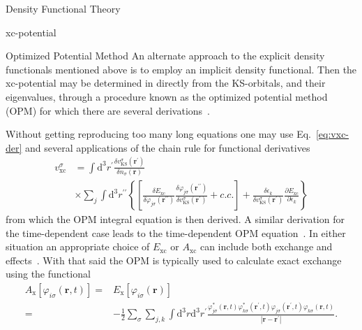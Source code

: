 \documentclass[letterpaper, 11 pt]{report}
\begin{document}
\begin{chapter}{Density Functional Theory \label{chap:dft}}
\begin{section}{xc-potential \label{sec:xcpot}}
\begin{subsection}{Optimized Potential Method \label{sec:opm}}
         An alternate approach to the explicit density functionals mentioned above is to employ an
         implicit density functional. Then the xc-potential may be determined in directly from the
         KS-orbitals, and their eigenvalues, through a procedure known as the optimized potential
         method~\cite{opm1, opm2} (OPM) for which there are several derivations~\cite{opm1, opm2, opm3,
         opm4, opm5, opm-rev}.

         Without getting reproducing too many long equations one may use Eq.~\eqref{eq:vxc-der} and
         several applications of the chain rule for functional derivatives
         \begin{equation} \label{eq:opm1}
            \begin{split}
               v^\sigma_\mathrm{xc} & = \int \mathrm{d}^3 r^\prime
                  \frac{\delta v^\sigma_\mathrm{KS}(\mathbf{r^\prime})}{\delta n_\sigma(\mathbf{r}) } \\
                                    & \times \sum\limits_{j} \int \mathrm{d}^3 r^{\prime\prime}
               \left\{ \left[ 
               \frac{\delta E_\mathrm{xc}}{\delta \varphi_{j\sigma}(\mathbf{r^{\prime\prime}}) }
               \frac{\delta \varphi_{j\sigma}(\mathbf{r^{\prime\prime}}) }
                    {\delta v^\sigma_\mathrm{KS}(\mathbf{r^{\prime}}) }
               + c.c.
            \right]
            + \frac{\delta \epsilon_k}{\delta v^\sigma_\mathrm{KS}(\mathbf{r^{\prime}})}
              \frac{\partial E_\mathrm{xc}}{\partial \epsilon_k}
            \right\}
            \end{split}
         \end{equation}
         from which the OPM integral equation is then derived. A similar derivation for the
         time-dependent case leads to the time-dependent OPM equation~\cite{tdopm}. In either situation
         an appropriate choice of $E_\mathrm{xc}$ or $A_\mathrm{xc}$ can include both exchange and
         effects~\cite{opm5, tdopm}. With that said the OPM is typically used to calculate exact
         exchange using the functional
         \begin{equation} \label{eq:xfunc}
            \begin{split}
               A_\mathrm{x}[\varphi_{i\sigma}(\mathbf{r},t)]
                 = & E_\mathrm{x}[\varphi_{i\sigma}(\mathbf{r})] \\
                = & -\frac{1}{2} \sum\limits_\sigma \sum\limits_{j,k}
                    \int\mathrm{d}^3 r \mathrm{d}^3 r^\prime
                    \frac{ \varphi^*_{j\sigma}(\mathbf{r},t) \varphi^*_{k\sigma}(\mathbf{r}^\prime,t)
                   \varphi_{j\sigma}(\mathbf{r}^\prime,t) \varphi_{k\sigma}(\mathbf{r},t)}
                   {\left| \mathbf{r} -\mathbf{r}^\prime \right|}.
            \end{split}
         \end{equation}


\end{subsection}
\end{section}
\end{chapter}
\end{document}
